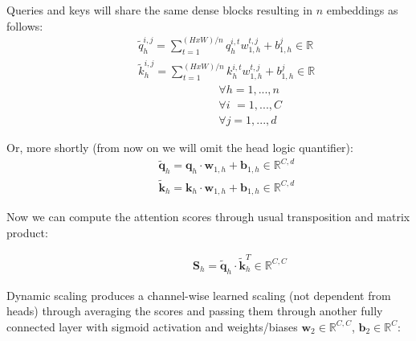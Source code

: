 \documentclass[fleqn,10pt]{SelfArx}
\begin{document}
Queries and keys will share the same dense blocks resulting in $n$ embeddings as follows:
\begin{align}
             & \hspace{1cm} \tilde{q}_{h}^{i,j} = \sum_{t=1}^{(HxW)/n}q_{h}^{i,t}w_{1,h}^{t,j} + b_{1,h}^{j} \in \mathbb{R}\\
             & \hspace{1cm} \tilde{k}_{h}^{i,j} = \sum_{t=1}^{(HxW)/n}k_{h}^{i,t}w_{1,h}^{t,j} + b_{1,h}^{j} \in \mathbb{R}\\
             & \hspace{4cm} \forall h = 1, ..., n \nonumber\\
             & \hspace{4cm} \forall i \, \,   = 1, ..., C \nonumber\\
             & \hspace{4cm} \forall j = 1, ..., d \nonumber
\end{align}


Or, more shortly (from now on we will omit the head logic quantifier):
\begin{align}
             & \hspace{1cm} \tilde{\mathbf{q}}_{h} = \mathbf{q}_{h} \cdot \mathbf{w}_{1,h} + \mathbf{b}_{1,h} \in \mathbb{R}^{C,d}\\
             & \hspace{1cm} \tilde{\mathbf{k}}_{h} = \mathbf{k}_{h} \cdot \mathbf{w}_{1,h} + \mathbf{b}_{1,h} \in \mathbb{R}^{C,d}
\end{align}

Now we can compute the attention scores through usual transposition and matrix product:

\begin{align}
             & \hspace{2cm} \mathbf{S}_{h} = \tilde{\mathbf{q}}_{h} \cdot  \tilde{\mathbf{k}}^{T}_{h} \in \mathbb{R}^{C,C}
\end{align}

Dynamic scaling produces a channel-wise learned scaling (not dependent from heads) through averaging the scores and passing them through another fully connected layer with sigmoid activation and weights/biases $\mathbf{w}_{2} \in \mathbb{R}^{C,C}$, $\mathbf{b}_{2} \in \mathbb{R}^{C}$:
\end{document}
